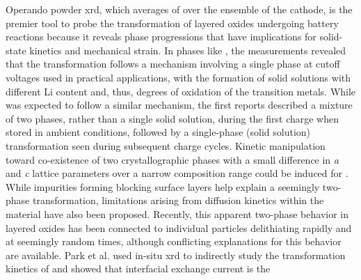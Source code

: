 \documentclass{article}
\begin{document}



Operando powder \gls{xrd}, which averages of over the ensemble of the
cathode, is the premier tool to probe the transformation of layered
oxides undergoing battery reactions because it reveals phase
progressions that have implications for solid-state kinetics and
mechanical strain.  In \nmc{} phases like \nmc[333]{}, the
measurements revealed that the transformation follows a mechanism
involving a single phase at cutoff voltages used in practical
applications,\cite{hulzen2018,ahn2017,zhou2016-2} with the formation
of solid solutions with different Li content and, thus, degrees of
oxidation of the transition metals. While \nca{} was expected to
follow a similar mechanism, the first reports described a mixture of
two phases, rather than a single solid solution, during the first
charge when stored in ambient conditions, followed by a single-phase
(solid solution) transformation seen during subsequent charge
cycles\cite{robert2015}. Kinetic manipulation toward co-existence of
two crystallographic phases with a small difference in \emph{a} and
\emph{c} lattice parameters over a narrow composition range could be
induced for \nmc[333]{} \cite{yoon2006,hua2018}. While impurities
forming blocking surface layers help explain a seemingly two-phase
transformation\cite{grenier2017}, limitations arising from diffusion
kinetics within the material have also been
proposed\cite{chapman2020}. Recently, this apparent two-phase behavior
in layered oxides has been connected to individual particles
delithiating rapidly and at seemingly random times\cite{chueh2021,
  zhao2022, rao2021, wang2020-6}, although conflicting explanations
for this behavior are available. Park et al. \cite{chueh2021} used
in-situ \gls{xrd} to indirectly study the transformation kinetics of
\nmc[333]{} and showed that interfacial exchange current is the
\end{document}
